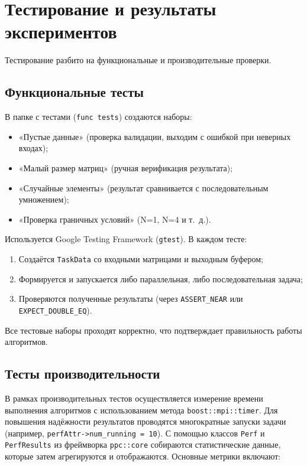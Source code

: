 \documentclass{report}
\begin{document}
\newpage

\section*{Тестирование и результаты экспериментов}

Тестирование разбито на функциональные и производительные проверки.

\subsection*{Функциональные тесты}

В папке с тестами (\texttt{func tests}) создаются наборы:

\begin{itemize}
    \item «Пустые данные» (проверка валидации, выходим с ошибкой при неверных входах);
    \item «Малый размер матриц» (ручная верификация результата);
    \item «Случайные элементы» (результат сравнивается с последовательным умножением);
    \item «Проверка граничных условий» (N=1, N=4 и т.~д.).
\end{itemize}

Используется Google Testing Framework (\texttt{gtest}). В каждом тесте:

\begin{enumerate}
    \item Создаётся \texttt{TaskData} со входными матрицами и выходным буфером;
    \item Формируется и запускается либо параллельная, либо последовательная задача;
    \item Проверяются полученные результаты (через \texttt{ASSERT\_NEAR} или \texttt{EXPECT\_DOUBLE\_EQ}).
\end{enumerate}

Все тестовые наборы проходят корректно, что подтверждает правильность работы алгоритмов.

\subsection*{Тесты производительности}

В рамках производительных тестов осуществляется измерение времени выполнения алгоритмов с использованием метода \texttt{boost::mpi::timer}. Для повышения надёжности результатов проводятся многократные запуски задачи (например, \texttt{perfAttr->num\_running = 10}). С помощью классов \texttt{Perf} и \texttt{PerfResults} из фреймворка \texttt{ppc::core} собираются статистические данные, которые затем агрегируются и отображаются. Основные метрики включают:
\end{document}
